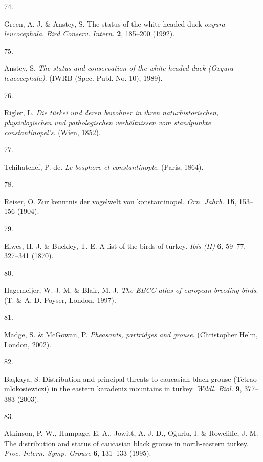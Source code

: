 \documentclass[
  letterpaper,
  DIV=11,
  numbers=noendperiod]{scrreprt}
\newlength{\cslhangindent}
\newlength{\csllabelwidth}
\newlength{\cslentryspacingunit} %
\newenvironment{CSLReferences}[2] %
 {%
  \setlength{\parindent}{0pt}
  \ifodd #1
  \let\oldpar\par
  \def\par{\hangindent=\cslhangindent\oldpar}
  \fi
  \setlength{\parskip}{#2\cslentryspacingunit}
 }%
 {}
\newcommand{\CSLLeftMargin}[1]{\parbox[t]{\csllabelwidth}{#1}}
\newcommand{\CSLRightInline}[1]{\parbox[t]{\linewidth - \csllabelwidth}{#1}\break}
\begin{document}
\begin{CSLReferences}{0}{0}
\leavevmode{}%
\CSLLeftMargin{74. }%
\CSLRightInline{Green, A. J. \& Anstey, S. The status of the
white-headed duck \emph{oxyura leucocephala}. \emph{Bird Conserv.
Intern.} \textbf{2}, 185--200 (1992).}

\leavevmode{}%
\CSLLeftMargin{75. }%
\CSLRightInline{Anstey, S. \emph{The status and conservation of the
white-headed duck ({Oxyura leucocephala})}. (IWRB (Spec. Publ. No. 10),
1989).}

\leavevmode{}%
\CSLLeftMargin{76. }%
\CSLRightInline{Rigler, L. \emph{Die türkei und deren bewohner in ihren
naturhistorischen, physiologischen und pathologischen verhältnissen vom
standpunkte constantinopel's}. (Wien, 1852).}

\leavevmode{}%
\CSLLeftMargin{77. }%
\CSLRightInline{Tchihatchef, P. de. \emph{Le bosphore et
constantinople}. (Paris, 1864).}

\leavevmode{}%
\CSLLeftMargin{78. }%
\CSLRightInline{Reiser, O. Zur kenntnis der vogelwelt von
konstantinopel. \emph{Orn. Jahrb.} \textbf{15}, 153--156 (1904).}

\leavevmode{}%
\CSLLeftMargin{79. }%
\CSLRightInline{Elwes, H. J. \& Buckley, T. E. A list of the birds of
turkey. \emph{Ibis (II)} \textbf{6}, 59--77, 327--341 (1870).}

\leavevmode{}%
\CSLLeftMargin{80. }%
\CSLRightInline{Hagemeijer, W. J. M. \& Blair, M. J. \emph{The EBCC
atlas of european breeding birds}. (T. \& A. D. Poyser, London, 1997).}

\leavevmode{}%
\CSLLeftMargin{81. }%
\CSLRightInline{Madge, S. \& McGowan, P. \emph{Pheasants, partridges and
grouse}. (Christopher Helm, London, 2002).}

\leavevmode{}%
\CSLLeftMargin{82. }%
\CSLRightInline{Başkaya, S. Distribution and principal threats to
caucasian black grouse ({Tetrao mlokosiewiczi}) in the eastern karadeniz
mountains in turkey. \emph{Wildl. Biol.} \textbf{9}, 377--383 (2003).}

\leavevmode{}%
\CSLLeftMargin{83. }%
\CSLRightInline{Atkinson, P. W., Humpage, E. A., Jowitt, A. J. D.,
Oğurlu, I. \& Rowcliffe, J. M. The distribution and status of caucasian
black grouse in north-eastern turkey. \emph{Proc. Intern. Symp. Grouse}
\textbf{6}, 131--133 (1995).}


\end{CSLReferences}
\end{document}
